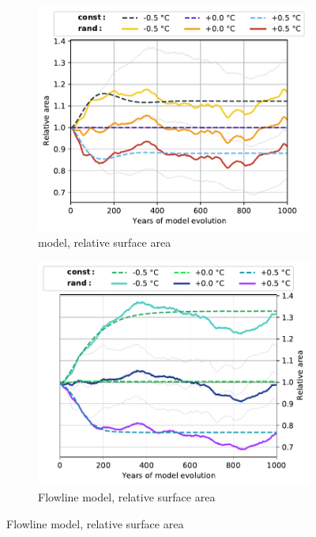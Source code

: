 \begin{figure}[p]
\begin{subfigure}[b]{0.476\textwidth}
          \end{subfigure}
          \begin{subfigure}[b]{0.476\textwidth}
            \caption{\Vas{} model, relative surface area}
            \label{fig:hintereisferner:area_vas}
            \centering
            \includegraphics[width=\textwidth]{../plots/final_plots/time_series/single_glaciers/area_norm_vas_Hintereisferner.pdf}
          \end{subfigure}
          \hfill
          \begin{subfigure}[b]{0.476\textwidth}
            \caption{Flowline model, relative surface area}
            \label{fig:hintereisferner:area_fl}
            \centering
            \includegraphics[width=\textwidth]{../plots/final_plots/time_series/single_glaciers/area_norm_fl_Hintereisferner.pdf}

\end{subfigure}
\end{figure}
